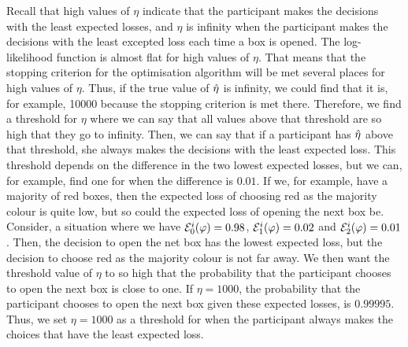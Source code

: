  

Recall that high values of $\eta$ indicate that the participant makes the decisions with the least expected losses, and $\eta$ is infinity when the participant makes the decisions with the least excepted loss each time a box is opened.  
The log-likelihood function is almost flat for high values of $\eta$. That means that the stopping criterion for the optimisation algorithm will be met several places for high values of $\eta$. Thus, if the true value of $\hat{\eta}$ is infinity, we could find that it is, for example, 10000 because the stopping criterion is met there. Therefore, we find a threshold for $\eta$ where we can say that all values above that threshold are so high that they go to infinity. Then, we can say that if a participant has $\hat{\eta}$ above that threshold, she always makes the decisions with the least expected loss. This threshold depends on the difference in the two lowest expected losses, but we can, for example, find one for when the difference is $0.01$.  If we, for example, have a majority of red boxes, then the expected loss of choosing red as the majority colour is quite low, but so could the expected loss of opening the next box be. Consider, a situation where we have $\mathcal{E}_0^i(\varphi)=0.98$, $\mathcal{E}_1^i(\varphi)=0.02$ and $\mathcal{E}_2^i(\varphi)=0.01$. Then, the decision to open the net box has the lowest expected loss, but the decision to choose red as the majority colour is not far away. We then want the threshold value of $\eta$ to so high that the probability that the participant chooses to open the next box is close to one. If $\eta=1000$, the probability that the participant chooses to open the next box given these expected losses, is $0.99995$. Thus, we set $\eta=1000$ as a threshold for when the participant
always makes the choices that have the least expected loss.

